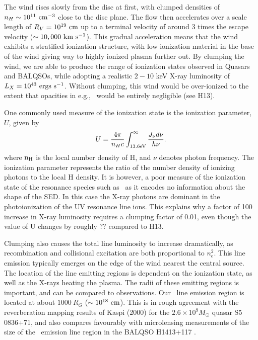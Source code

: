 \documentclass[useAMS,usenatbib]{mn2e_x}
\begin{document}
The wind rises slowly from the disc at first, with clumped densities
of $n_H \sim 10^{11}~\rm{cm^{-3}}$ close to the disc plane.
The flow then accelerates over a scale length of $R_V=10^{19}~\rm{cm}$
up to a terminal velocity of around $3$ times the escape velocity 
($\sim10,000~\rm{km~s^{-1}}$). This gradual acceleration means that
the wind exhibits a stratified ionization structure, with low ionization material
in the base of the wind giving way to highly ionized plasma further out.
By clumping the wind, we are able to produce the range of ionization states observed
in Quasars and BALQSOs, while adopting a realistic $2-10$ keV X-ray luminosity
of $L_{X}=10^{43}~\rm{ergs~s^{-1}}$. Without clumping, this wind would be over-ionized 
to the extent that opacities in e.g., \civ\ would be entirely negligible (see H13).

One commonly used measure of the ionization state is the ionization parameter, $U$, given by
\begin{equation}
U = \frac{4\pi}{n_H c}\int_{13.6{\rm{eV}}}^{\infty}\frac{{J_{\nu}d\nu}}{h\nu}.
\end{equation}
\noindent where $\rm{n_H}$ is the local number density of H, and $\nu$ denotes photon 
frequency. The ionization parameter represents the ratio of the number density of 
ionizing photons to the local H density. It is however, a poor measure of the 
ionization state of the resonance species such as \civ\ as it encodes no information
about the shape of the SED. In this case the X-ray photons 
are dominant in the photoionization of the UV resonance line ions. 
This explains why a factor of 100 increase in X-ray luminosity requires
a clumping factor of 0.01, even though the value of U changes by roughly ?? compared to 
H13. 

Clumping also causes the total line luminosity to increase dramatically,
as recombination and collisional excitation are both proportional to
$n_e^2$. This line emission typically emerges on the edge of the wind
nearest the central source. The location of the line emitting regions
is dependent on the ionization state, as well as the X-rays heating the plasma.
The radii of these emitting regions is important,
and can be compared to observations. Our \civ\ line emission region 
is located at about $1000~R_G$ ($\sim10^{18}~\rm{cm}$).
This is in rough agreement with the reverberation mapping 
results of Kaspi (2000) for the $2.6\times10^{9} M_\odot$ quasar S5 0836+71,
and also compares favourably with microlensing measurements of the size of the
\civ\ emission line region in the BALQSO H1413+117 \citep{odowd2015}.
\end{document}
